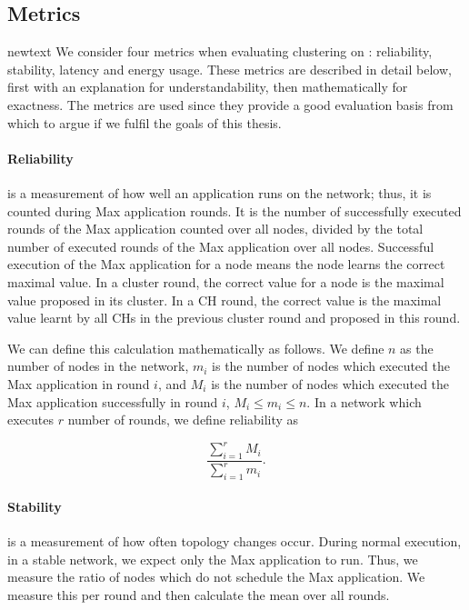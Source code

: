 \subsection{Metrics}
\begin{newtext}{newtext}
We consider four metrics when evaluating clustering on \atwo{}: reliability, stability, latency and energy usage. These metrics are described in detail below, first with an explanation for understandability, then mathematically for exactness. The metrics are used since they provide a good evaluation basis from which to argue if we fulfil the goals of this thesis.



\paragraph*{Reliability} is a measurement of how well an application runs on the network; thus, it is counted during Max application rounds. It is the number of successfully executed rounds of the Max application counted over all nodes, divided by the total number of executed rounds of the Max application over all nodes. Successful execution of the Max application for a node means the node learns the correct maximal value. In a cluster round, the correct value for a node is the maximal value proposed in its cluster. In a CH round, the correct value is the maximal value learnt by all CHs in the previous cluster round and proposed in this round.

We can define this calculation mathematically as follows. We define $n$ as the number of nodes in the network, $m_i$ is the number of nodes which executed the Max application in round $i$, and $M_i$ is the number of nodes which executed the Max application successfully in round $i$, $M_i \leq m_i \leq n$. In a network which executes $r$ number of rounds, we define reliability as 

\begin{equation}
    \frac{\sum\limits_{i=1}^{r}{M_i}}{\sum\limits_{i=1}^{r}{m_i}}.
\end{equation}

\newpage
\paragraph*{Stability} is a measurement of how often topology changes occur. During normal execution, in a stable network, we expect only the Max application to run. Thus, we measure the ratio of nodes which do not schedule the Max application. We measure this per round and then calculate the mean over all rounds.


\end{newtext}
